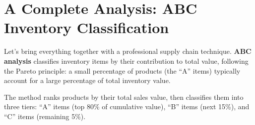 \documentclass[
  letterpaper,
  DIV=11,
  numbers=noendperiod]{scrreprt}
\begin{document}
\section{A Complete Analysis: ABC Inventory
Classification}\label{a-complete-analysis-abc-inventory-classification}

Let's bring everything together with a professional supply chain
technique. \textbf{ABC analysis} classifies inventory items by their
contribution to total value, following the Pareto principle: a small
percentage of products (the ``A'' items) typically account for a large
percentage of total inventory value.

The method ranks products by their total sales value, then classifies
them into three tiers: ``A'' items (top 80\% of cumulative value), ``B''
items (next 15\%), and ``C'' items (remaining 5\%).
\end{document}

